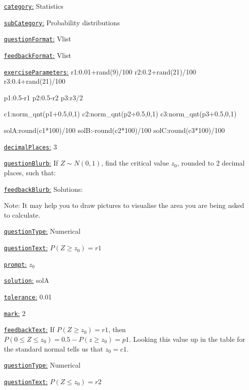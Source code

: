 \documentclass[preview]{standalone}
\newcommand \fieldname[1]{\underline{\texttt{#1}:}}
\begin{document}
\fieldname{category}  %
Statistics

\fieldname{subCategory} %
Probability distributions

\fieldname{questionFormat}
Vlist

\fieldname{feedbackFormat}
Vlist

\fieldname{exerciseParameters}
r1:0.01+rand(9)/100
r2:0.2+rand(21)/100
r3:0.4+rand(21)/100

p1:0.5-r1
p2:0.5-r2
p3:r3/2

c1:norm_qnt(p1+0.5,0,1)
c2:norm_qnt(p2+0.5,0,1)
c3:norm_qnt(p3+0.5,0,1)

solA:round(c1*100)/100
solB:-round(c2*100)/100
solC:round(c3*100)/100

\fieldname{decimalPlaces}
3

\fieldname{questionBlurb}
If $Z \sim N(0,1)$, find the critical value $z_0$, rounded to 2 decimal places, such that:

\fieldname{feedbackBlurb}
Solutions:

Note: It may help you to draw pictures to visualise the area you are being asked to calculate.

\fieldname{questionType}
Numerical

\fieldname{questionText}
$P(Z \ge z_0) = {r1}$

\fieldname{prompt}
$z_0$

\fieldname{solution}
solA

\fieldname{tolerance}
0.01

\fieldname{mark}
2

\fieldname{feedbackText}
If $P(Z \ge z_0) = {r1}$, then $P(0 \le Z \le z_0)  = 0.5 - P(z \ge z_0) = {p1}$. Looking this value up in the table for the standard normal tells us that $z_0 = {c1}$.

\fieldname{questionType}
Numerical

\fieldname{questionText}
$P(Z \le z_0) = {r2}$
\end{document}
